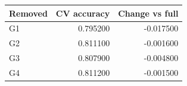 \begin{tabular}{lrr}
\toprule
Removed & CV accuracy & Change vs full \\
\midrule
G1 & 0.795200 & -0.017500 \\
G2 & 0.811100 & -0.001600 \\
G3 & 0.807900 & -0.004800 \\
G4 & 0.811200 & -0.001500 \\
\bottomrule
\end{tabular}
